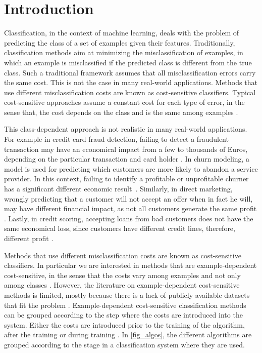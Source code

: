 \chapter{Introduction}

  Classification, in the context of machine learning, deals with the problem of 
  predicting the class of a set of examples given their features. Traditionally, classification 
  methods aim at minimizing the misclassification of examples, in which an example is 
  misclassified if the predicted class is different from the true class. Such a traditional 
  framework assumes that all misclassification errors carry the same cost. This is not the case in 
  many real-world applications. Methods that use different misclassification costs are known as 
  cost-sensitive classifiers. Typical cost-sensitive approaches assume a constant cost for each 
  type of error, in the sense that, the cost depends on the class and is the same among examples 
  \citep{Elkan2001,Kim2012}. 
  
  This class-dependent approach is not realistic in many real-world applications. For 
  example in credit card fraud detection, failing to detect a fraudulent transaction may have an 
  economical impact from a few to thousands of Euros, depending on the particular transaction and 
  card holder \citep{Ngai2011a}. In churn modeling, a model is used for predicting which
  customers are more likely to abandon a service provider. In this context, failing to identify a 
  profitable or unprofitable churner has a significant different economic 
  result~\citep{Verbraken2013}. Similarly, in direct marketing, wrongly predicting that a customer 
  will not accept an offer when in fact he will, may have different financial impact, as not all 
  customers generate the same profit \citep{Zadrozny2003}. Lastly, in credit scoring, accepting 
  loans from bad customers does not have the same economical loss, since customers have different 
  credit lines, therefore, different profit \citep{Verbraken2014}.
  
  Methods that use different misclassification costs are known as cost-sensitive classifiers. In 
  particular we are interested in methods that are example-dependent cost-sensitive, in the sense 
  that the costs vary among examples and not only among classes \citep{Elkan2001}. However, the 
  literature on example-dependent cost-sensitive methods is limited, mostly because there is a 
  lack of publicly available datasets that fit the problem \citep{MacAodha2013}.
  Example-dependent cost-sensitive classification methods can be grouped according to the step 
  where the costs are introduced into the system. Either the costs are introduced prior to the 
  training of the algorithm, after the training or during training \citep{Wang2013}. In 
  \figurename{ \ref{fig_algos}}, the different algorithms are grouped according to the stage in a 
  classification system where they are used.


